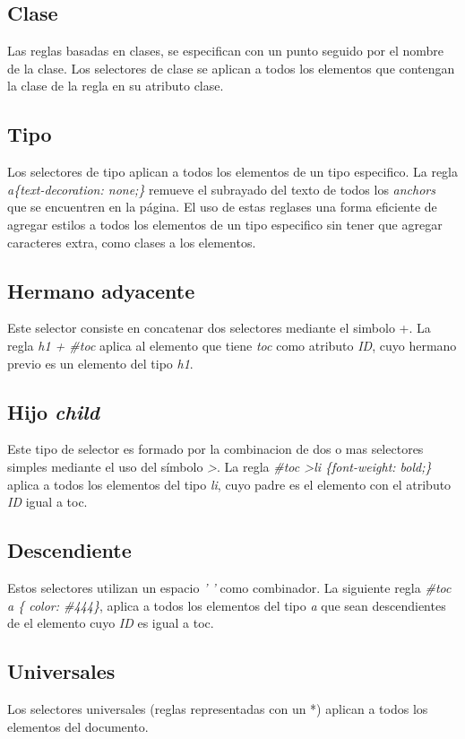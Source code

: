 \subsection{Clase}
Las reglas basadas en clases, se especifican con un punto seguido por el nombre de la clase. Los selectores de clase se aplican a todos los elementos que contengan la clase
de la regla en su atributo clase.

\subsection{Tipo}
Los selectores de tipo aplican a todos los elementos de un tipo especifico. La regla \emph{a\{text-decoration: none;\}} remueve el subrayado del texto de todos los
\emph{anchors} que se encuentren en la página. El uso de estas reglases una forma eficiente de agregar estilos a todos los elementos de un tipo especifico sin tener que
agregar caracteres extra, como clases a los elementos.

\subsection{Hermano adyacente}
Este selector consiste en concatenar dos selectores mediante el simbolo +. La regla \emph{h1 + \#toc} aplica al elemento que tiene \emph{toc} como atributo \emph{ID}, cuyo
hermano previo es un elemento del tipo \emph{h1}.

\subsection{Hijo \emph{child}}
Este tipo de selector es formado por la combinacion de dos o mas selectores simples mediante el uso del símbolo \emph{\textgreater}. La regla \emph{\#toc \textgreater   li \{font-weight: bold;\}}
aplica a todos los elementos del tipo \emph{li}, cuyo padre es el elemento con el atributo \emph{ID} igual a toc.

\subsection{Descendiente}
Estos selectores utilizan un espacio \emph{' '} como combinador. La siguiente regla \emph{\#toc a \{ color: \#444\}}, aplica a todos los elementos del tipo \emph{a} que sean
descendientes de el elemento cuyo \emph{ID} es igual a toc.

\subsection{Universales}
Los selectores universales (reglas representadas con un *) aplican a todos los elementos del documento.

